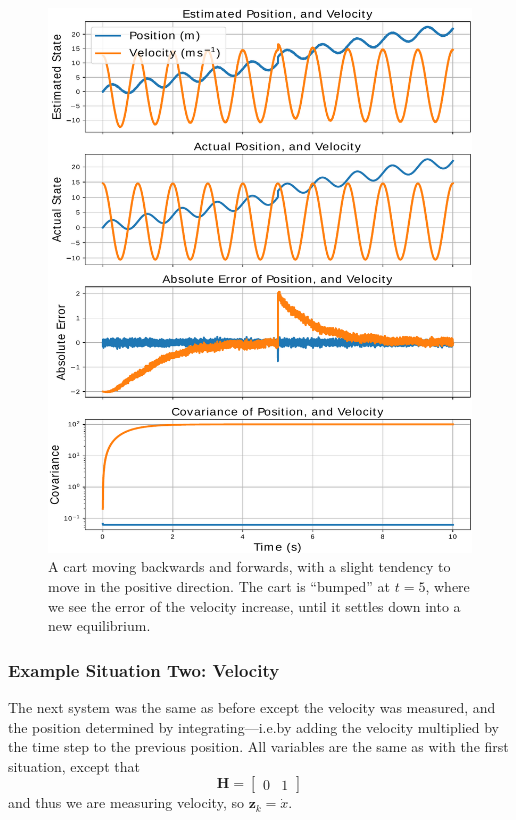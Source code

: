 \documentclass[12pt]{article}
\begin{document}
\begin{figure}[thp]
	\centering
	
	\includegraphics[width=\textwidth]{1d-position.pdf}
	
	\caption{A cart moving backwards and forwards, with a slight tendency to move in the positive direction. The cart is ``bumped'' at $t=5$, where we see the error of the velocity increase, until it settles down into a new equilibrium.}
	\label{1d_position_fig}
\end{figure}

\subsubsection{Example Situation Two: Velocity}

The next system was the same as before except the velocity was measured, and the position determined by integrating---i.e.\@ by adding the velocity multiplied by the time step to the previous position. All variables are the same as with the first situation, except that
$$\mathbf{H} = \begin{bmatrix} 0 & 1 \end{bmatrix}$$
and thus we are measuring velocity, so $\mathbf{z}_k=\dot{x}$.
\end{document}
